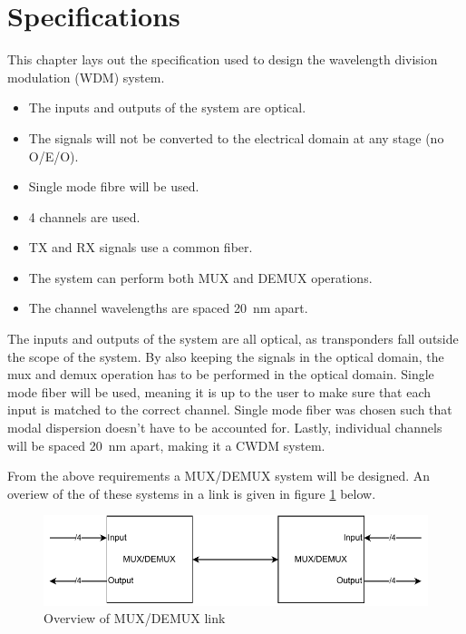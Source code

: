 \section{Specifications}
\label{sec:specifications}
This chapter lays out the specification used to design the wavelength division modulation (WDM) system.

\begin{itemize}
 \item The inputs and outputs of the system are optical.
 \item The signals will not be converted to the electrical domain at any stage (no O/E/O). 
 \item Single mode fibre will be used.
 \item 4 channels are used.
 \item TX and RX signals use a common fiber.
 \item The system can perform both MUX and DEMUX operations.
 \item The channel wavelengths are spaced \qty{20}{\nm} apart.
\end{itemize}

The inputs and outputs of the system are all optical, as transponders fall outside the 
scope of the system. By also keeping the signals in the optical domain, the mux and demux 
operation has to be performed in the optical domain. Single mode fiber will be used, 
meaning it is up to the user to make sure that each input is matched to the correct channel. 
Single mode fiber was chosen such that modal dispersion doesn't have to be accounted for. 
Lastly, individual channels will be spaced \qty{20}{\nm} apart, making it a CWDM system.

From the above requirements a MUX/DEMUX system will be designed. An overiew of the of these 
systems in a link is given in figure \ref{fig:link_overview} below.

\begin{figure}[ht]
    \includegraphics[width=\linewidth]{images/link_overview.pdf}
    \caption{Overview of MUX/DEMUX link}
    \label{fig:link_overview}
\end{figure}